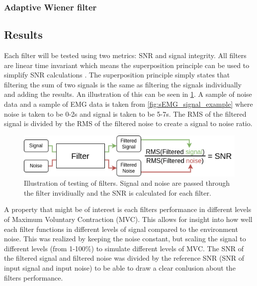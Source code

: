 \subsubsection{Adaptive Wiener filter}


\subsection{Results}
Each filter will be tested using two metrics: SNR and signal integrity. All filters are linear time invariant which means the superposition principle can be used to simplify SNR calculations \cite{wiki:lti_system}. The superposition principle simply states that filtering the sum of two signals is the same as filtering the signals individually and adding the results. An illustration of this can be seen in \ref{fig:filter_process}. A sample of noise data and a sample of EMG data is taken from \ref{fig:sEMG_signal_example} where noise is taken to be 0-2s and signal is taken to be 5-7s. The RMS of the filtered signal is divided by the RMS of the filtered noise to create a signal to noise ratio.

\begin{figure}[h!t]
	\begin{center}
		\includegraphics[width=1.0\columnwidth]{images/filter_process.png}
	\end{center}
	\caption{Illustration of testing of filters. Signal and noise are passed through the filter invidiually and the SNR is calculated for each filter.}
	\label{fig:filter_process}
\end{figure}

A property that might be of interest is each filters performance in different levels of Maximum Voluntary Contraction (MVC). This allows for insight into how well each filter functions in different levels of signal compared to the environment noise. This was realized by keeping the noise constant, but scaling the signal to different levels (from 1-100\%) to simulate different levels of MVC. The SNR of the filtered signal and filtered noise was divided by the reference SNR (SNR of input signal and input noise) to be able to draw a clear conlusion about the filters performance.

